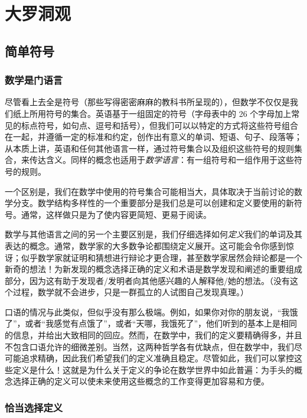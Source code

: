 \section{大罗洞观}\label{sec:section1.2}

\subsection{简单符号}

\subsubsection*{数学是门语言}

尽管看上去全是符号（那些写得密密麻麻的教科书所呈现的），但数学不仅仅是我们纸上所用符号的集合。英语基于一组固定的符号（字母表中的 26 个字母加上常见的标点符号，如句点、逗号和括号），但我们可以以特定的方式将这些符号组合在一起，并遵循一定的标准和约定，创作出有意义的单词、短语、句子、段落等；从本质上讲，英语和任何其他语言一样，通过符号集合以及组织这些符号的规则集合，来传达含义。同样的概念也适用于\emph{数学语言}：有一组符号和一组作用于这些符号的规则。

一个区别是，我们在数学中使用的符号集合可能相当大，具体取决于当前讨论的数学分支。数学结构多样性的一个重要部分是我们总是可以创建和定义要使用的新符号。通常，这样做只是为了使内容更简短、更易于阅读。

数学与其他语言之间的另一个主要区别是，我们仔细选择如何\emph{定义}我们的单词及其表达的概念。通常，数学家的大多数争论都围绕定义展开。这可能会令你感到惊讶；似乎数学家就证明和猜想进行辩论才更合理，甚至数学家居然会辩论都是一个新奇的想法！为新发现的概念选择正确的定义和术语是数学发现和阐述的重要组成部分，因为这有助于发现者/发明者向其他感兴趣的人解释他/她的想法。（没有这个过程，数学就不会进步，只是一群孤立的人试图自己发现真理。）

口语的情况与此类似，但似乎没有那么极端。例如，如果你对你的朋友说，``我饿了''，或者``我感觉有点饿了''，或者``天哪，我饿死了''，他们听到的基本上是相同的信息，并给出大致相同的回应。然而，在数学中，我们的定义要精确得多，并且不包含口语允许的细微差别。当然，这两种哲学各有优缺点，但在数学中，我们尽可能追求精确，因此我们希望我们的定义准确且稳定。尽管如此，我们可以掌控这些定义是什么！这就是为什么关于定义的争论在数学世界中如此普遍：为手头的概念选择正确的定义可以使未来使用这些概念的工作变得更加容易和方便。

\subsubsection*{恰当选择定义}

